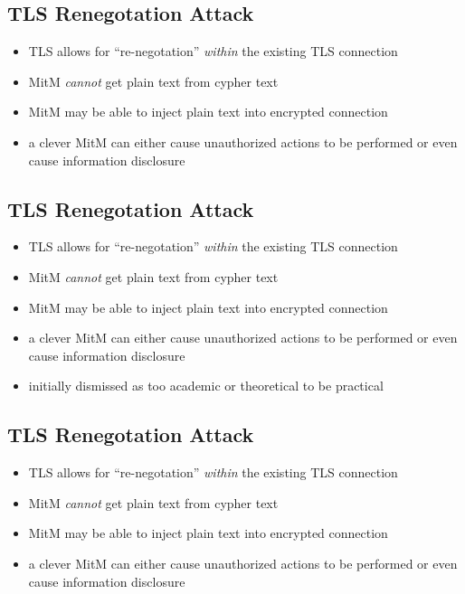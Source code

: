 \documentclass[xga]{xdvislides}
\begin{document}
\subsection{TLS Renegotation Attack}
\begin{itemize}
	\item TLS allows for ``re-negotation'' {\em within} the existing TLS
		connection
	\item MitM {\em cannot} get plain text from cypher text
	\item MitM may be able to inject plain text into encrypted connection
	\item a clever MitM can either cause unauthorized actions to be performed
		or even cause information disclosure
\end{itemize}

\subsection{TLS Renegotation Attack}
\begin{itemize}
	\item TLS allows for ``re-negotation'' {\em within} the existing TLS
		connection
	\item MitM {\em cannot} get plain text from cypher text
	\item MitM may be able to inject plain text into encrypted connection
	\item a clever MitM can either cause unauthorized actions to be performed
		or even cause information disclosure
\end{itemize}
\addvspace{.5in}

\begin{itemize}
	\item initially dismissed as too academic or theoretical to be practical
\end{itemize}

\subsection{TLS Renegotation Attack}
\begin{itemize}
	\item TLS allows for ``re-negotation'' {\em within} the existing TLS
		connection
	\item MitM {\em cannot} get plain text from cypher text
	\item MitM may be able to inject plain text into encrypted connection
	\item a clever MitM can either cause unauthorized actions to be performed
		or even cause information disclosure
\end{itemize}
\addvspace{.5in}
\end{document}
